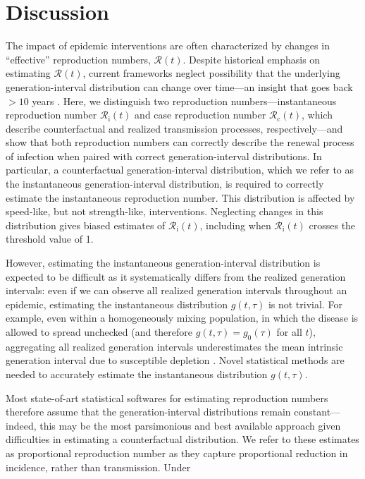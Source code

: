 \documentclass[12pt]{article}
\newcommand{\Rx}[1]{\ensuremath{{\mathcal R}_{#1}}\xspace}
\newcommand{\Rc}{\Rx{\mathrm{c}}}
\newcommand{\Ri}{\Rx{\mathrm{i}}}
\newcommand{\RR}{\ensuremath{{\mathcal R}}\xspace}
\begin{document}
\section{Discussion}

The impact of epidemic interventions are often characterized by changes in ``effective'' reproduction numbers, $\RR(t)$.
Despite historical emphasis on estimating $\RR(t)$, current frameworks neglect possibility that the underlying generation-interval distribution can change over time---an insight that goes back $>10$ years \citep{fraser2007estimating}.
Here, we distinguish two reproduction numbers---instantaneous reproduction number $\Ri(t)$ and case reproduction number $\Rc(t)$, which describe counterfactual and realized transmission processes, respectively---and show that both reproduction numbers can correctly describe the renewal process of infection when paired with correct generation-interval distributions.
In particular, a counterfactual generation-interval distribution, which we refer to as the instantaneous generation-interval distribution, is required to correctly estimate the instantaneous reproduction number. 
This distribution is affected by speed-like, but not strength-like, interventions.
Neglecting changes in this distribution gives biased estimates of $\Ri(t)$, including when $\Ri(t)$ crosses the threshold value of 1.

However, estimating the instantaneous generation-interval distribution is expected to be difficult as it systematically differs from the realized generation intervals: even if we can observe all realized generation intervals throughout an epidemic, estimating the instantaneous distribution $g(t, \tau)$ is not trivial.
For example, even within a homogeneously mixing population, in which the disease is allowed to spread unchecked (and therefore $g(t, \tau) = g_0(\tau)$ for all $t$), aggregating all realized generation intervals underestimates the mean intrinsic generation interval due to susceptible depletion \citep{park2020inferring}.
Novel statistical methods are needed to accurately estimate the instantaneous distribution $g(t, \tau)$.

Most state-of-art statistical softwares for estimating reproduction numbers therefore assume that the generation-interval distributions remain constant---indeed, this may be the most parsimonious and best available approach given difficulties in estimating a counterfactual distribution.
We refer to these estimates as proportional reproduction number as they capture proportional reduction in incidence, rather than transmission.
Under 
\end{document}
